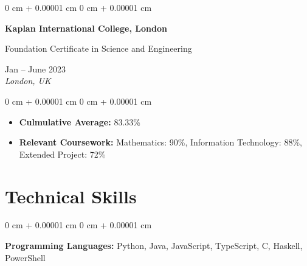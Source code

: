 \documentclass[10pt, a4paper]{article}
\newenvironment{highlights}{
    \begin{itemize}[
        topsep=0.10 cm,
        parsep=0.10 cm,
        partopsep=0pt,
        itemsep=0pt,
        leftmargin=20pt
    ]
}{
    \end{itemize}
} %
\newenvironment{onecolentry}{
    \begin{adjustwidth}{
        0 cm + 0.00001 cm
    }{
        0 cm + 0.00001 cm
    }
}{
    \end{adjustwidth}
} %
\newenvironment{twocolentry}[2][]{
    \onecolentry
    \def\secondColumn{#2}
    \setcolumnwidth{\fill, 4.5 cm}
    \begin{paracol}{2}
}{
    \switchcolumn \raggedleft \secondColumn
    \end{paracol}
    \endonecolentry
} %
\begin{document}
    \vspace{0.2 cm}

    \begin{twocolentry}{
        Jan -- June 2023 \\
        \textit{London, UK}
    }
        \textbf{Kaplan International College, London}
        
        Foundation Certificate in Science and Engineering
    \end{twocolentry}

    \vspace{0.10 cm}
    \begin{onecolentry}
        \begin{highlights}
            \item \textbf{Culmulative Average:} 83.33\%
            \item \textbf{Relevant Coursework:} Mathematics: 90\%, Information Technology: 88\%, Extended Project: 72\%
        \end{highlights}
    \end{onecolentry}




    \section{Technical Skills}

    \begin{onecolentry}
        \textbf{Programming Languages:} Python, Java, JavaScript, TypeScript, C, Haskell, PowerShell
    \end{onecolentry}
\end{document}
